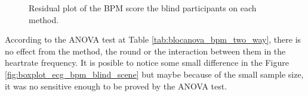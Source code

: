 \begin{figure}[!htb]
\begin{minipage}{0.45\textwidth}
        \caption{Residual plot of the BPM score the blind participants on each method.}
        \label{fig:residplot_bpm_two_way}
    \end{minipage}
\end{figure}


%


According to the ANOVA test at Table \ref{tab:blocanova_bpm_two_way}, there is no effect from the method, the round or the interaction between them in the heartrate frequency. It is posible to notice some small difference in the Figure \ref{fig:boxplot_ecg_bpm_blind_scene} but maybe because of the small sample size, it was no sensitive enough to be proved by the ANOVA test.

\FloatBarrier